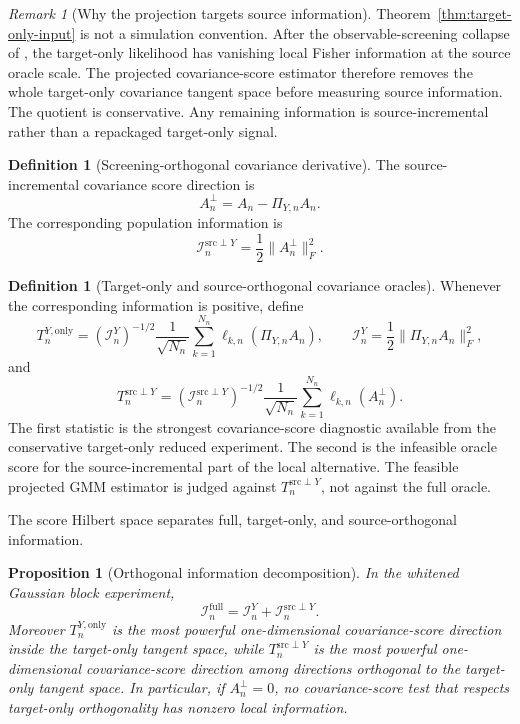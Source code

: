 \documentclass[11pt,a4paper]{amsart}
\theoremstyle{plain}
\newtheorem{proposition}[theorem]{Proposition}
\theoremstyle{definition}
\newtheorem{definition}[theorem]{Definition}
\theoremstyle{remark}
\newtheorem{remark}[theorem]{Remark}
\newcommand{\scrI}{\mathcal{I}}
\begin{document}
\begin{remark}[Why the projection targets source information]
Theorem~\ref{thm:target-only-input} is not a simulation convention.  After the
observable-screening collapse of \cite{vidal2026dynamic}, the target-only likelihood has vanishing
local Fisher information at the source oracle scale.  The projected covariance-score estimator
therefore removes the whole target-only covariance tangent space before measuring source
information.  The quotient is conservative.  Any remaining information is source-incremental rather
than a repackaged target-only signal.
\end{remark}

\begin{definition}[Screening-orthogonal covariance derivative]\label{def:screened-cov-derivative}
The source-incremental covariance score direction is
\[
        A_{n}^{\perp}
        =
        A_n-\Pi_{Y,n}A_n.
\]
The corresponding population information is
\[
        \scrI_n^{\mathrm{src}\perp Y}
        =
        \frac12\|A_n^{\perp}\|_F^2.
\]
\end{definition}

\begin{definition}[Target-only and source-orthogonal covariance oracles]
Whenever the corresponding information is positive, define
\[
        T_n^{Y,\mathrm{only}}
        =
        (\scrI_n^{Y})^{-1/2}
        \frac1{\sqrt{N_n}}
        \sum_{k=1}^{N_n}\ell_{k,n}(\Pi_{Y,n}A_n),
        \qquad
        \scrI_n^{Y}=\frac12\|\Pi_{Y,n}A_n\|_F^2,
\]
and
\[
        T_n^{\mathrm{src}\perp Y}
        =
        (\scrI_n^{\mathrm{src}\perp Y})^{-1/2}
        \frac1{\sqrt{N_n}}
        \sum_{k=1}^{N_n}\ell_{k,n}(A_n^\perp).
\]
The first statistic is the strongest covariance-score diagnostic available from the conservative
target-only reduced experiment.  The second is the infeasible oracle score for the source-incremental
part of the local alternative.  The feasible projected GMM estimator is judged against
\(T_n^{\mathrm{src}\perp Y}\), not against the full oracle.
\end{definition}

The score Hilbert space separates full, target-only, and source-orthogonal information.

\begin{proposition}[Orthogonal information decomposition]\label{prop:orthogonal-info-decomposition}
In the whitened Gaussian block experiment,
\[
        \scrI_n^{\mathrm{full}}
        =
        \scrI_n^{Y}
        +
        \scrI_n^{\mathrm{src}\perp Y}.
\]
Moreover \(T_n^{Y,\mathrm{only}}\) is the most powerful one-dimensional covariance-score direction
inside the target-only tangent space, while \(T_n^{\mathrm{src}\perp Y}\) is the most powerful
one-dimensional covariance-score direction among directions orthogonal to the target-only tangent
space.  In particular, if \(A_n^\perp=0\), no covariance-score test that respects target-only
orthogonality has nonzero local information.
\end{proposition}
\end{document}
